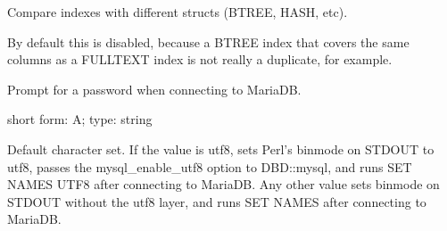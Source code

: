 \documentclass[letterpaper,10pt,english]{sphinxmanual}
\begin{document}
\begin{fulllineitems}
\label{\detokenize{mariadb-index-checker:cmdoption-mariadb-index-checker-all-structs}}
\sphinxAtStartPar
Compare indexes with different structs (BTREE, HASH, etc).

\sphinxAtStartPar
By default this is disabled, because a BTREE index that covers the same columns
as a FULLTEXT index is not really a duplicate, for example.

\end{fulllineitems}


\begin{fulllineitems}
\label{\detokenize{mariadb-index-checker:cmdoption-mariadb-index-checker-ask-pass}}
\sphinxAtStartPar
Prompt for a password when connecting to MariaDB.

\end{fulllineitems}


\begin{fulllineitems}
\label{\detokenize{mariadb-index-checker:cmdoption-mariadb-index-checker-charset}}
\sphinxAtStartPar
short form: \sphinxhyphen{}A; type: string

\sphinxAtStartPar
Default character set.  If the value is utf8, sets Perl’s binmode on
STDOUT to utf8, passes the mysql\_enable\_utf8 option to DBD::mysql, and runs SET
NAMES UTF8 after connecting to MariaDB.  Any other value sets binmode on STDOUT
without the utf8 layer, and runs SET NAMES after connecting to MariaDB.

\end{fulllineitems}
\end{document}
